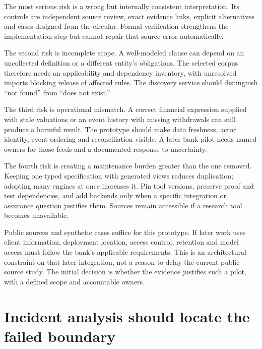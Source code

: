 The most serious risk is a wrong but internally consistent interpretation. Its
controls are independent source review, exact evidence links, explicit alternatives
and cases designed from the circular. Formal verification strengthens the
implementation step but cannot repair that source error automatically.

The second risk is incomplete scope. A well-modeled clause can depend on an
uncollected definition or a different entity's obligations. The selected corpus
therefore needs an applicability and dependency inventory, with unresolved imports
blocking release of affected rules. The discovery service should distinguish
``not found'' from ``does not exist.''

The third risk is operational mismatch. A correct financial expression supplied
with stale valuations or an event history with missing withdrawals can still
produce a harmful result. The prototype should make data freshness, actor
identity, event ordering and reconciliation visible. A later bank pilot needs
named owners for those feeds and a documented response to uncertainty.


The fourth risk is creating a maintenance burden greater than the one removed.
Keeping one typed specification with generated views reduces duplication;
adopting many engines at once increases it. Pin tool versions, preserve proof and
test dependencies, and add backends only when a specific integration or assurance
question justifies them. Sources remain accessible if a research tool becomes
unavailable.

Public sources and synthetic cases suffice for this prototype. If later work
uses client information, deployment location, access control, retention and model
access must follow the bank's applicable requirements. This is an architectural
constraint on that later integration, not a reason to delay the current public
source study. The initial decision is whether the evidence justifies such a pilot,
with a defined scope and accountable owners.

\section{Incident analysis should locate the failed boundary}
\label{merge:M10:08}


